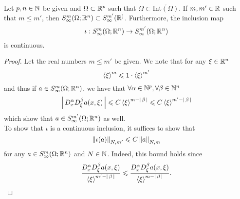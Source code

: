 \documentclass{article}
\begin{document}
\begin{fprop}
    Let $p, n \in \N$ be given and $\Omega \subset \R^p$ such that $\Omega \subset \overline{\mathrm{Int}(\Omega)}$. If $m, m' \in \R$ such that $m \leq m'$, then $S^m_\infty(\Omega; \R^n) \subset S^{m'}_\infty(\R^)$. Furthermore, the inclusion map 
    \begin{align*}
    \iota: S^m_\infty(\Omega; \R^n) \to S^{m'}_\infty(\Omega; \R^n)
    \end{align*}
    is continuous. 
\end{fprop}
\begin{proof}
    Let the real numbers $m \leq m'$ be given. We note that for any $\xi \in \R^n$
    \[
    \sym[\xi]^m \leq 1 \cdot \sym[\xi]^{m'}
    \]
    and thus if $a \in S^{m}_\infty(\Omega; \R^n)$, we have that $\forall \alpha \in \N^p, \forall \beta \in \N^n$
    \[
    \abs{D^\alpha_x D^\beta_\xi a(x, \xi)} \leq C \sym[\xi]^{m - \abs{\beta}} \leq C \sym[\xi]^{m' - \abs{\beta}} 
    \]
    which show that $a \in S^{m'}_\infty(\Omega; \R^n)$ as well. \\
    
    To show that $\iota$ is a continuous inclusion, it suffices to show that 
    \[
    \norm[\iota(a)]_{N, m'} \leq C \norm[a]_{N, m}
    \]
    for any $a \in S^{m}_\infty(\Omega; \R^n)$ and $N \in \N$. Indeed, this bound holds since 
    \[
    \frac{D^\alpha_x D^\beta_\xi a(x, \xi)}{\sym[\xi]^{m' - \abs{\beta}}}  \leq \frac{D^\alpha_x D^\beta_\xi a(x, \xi)}{\sym[\xi]^{m - \abs{\beta}}}. 
    \]
\end{proof}
\hfill \\ [3em]
\end{document}
